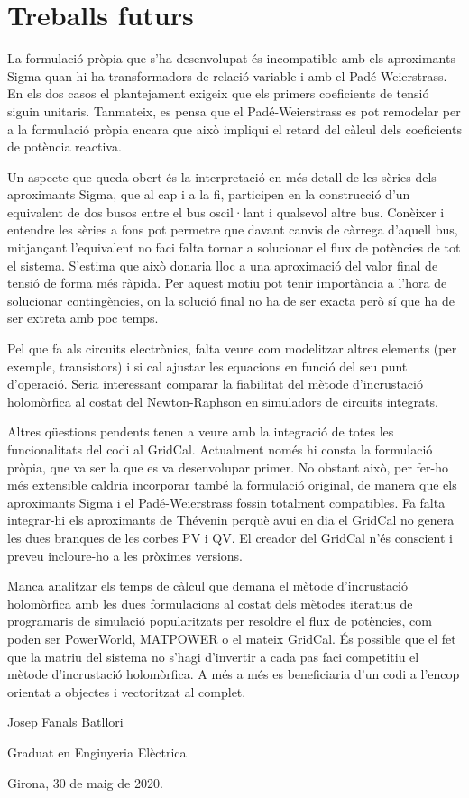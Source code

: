 \section{Treballs futurs}
La formulació pròpia que s'ha desenvolupat és incompatible amb els aproximants Sigma quan hi ha transformadors de relació variable i amb el Padé-Weierstrass. En els dos casos el plantejament exigeix que els primers coeficients de tensió siguin unitaris. Tanmateix, es pensa que el Padé-Weierstrass es pot remodelar per a la formulació pròpia encara que això impliqui el retard del càlcul dels coeficients de potència reactiva. 

Un aspecte que queda obert és la interpretació en més detall de les sèries dels aproximants Sigma, que al cap i a la fi, participen en la construcció d'un equivalent de dos busos entre el bus oscil·lant i qualsevol altre bus. Conèixer i entendre les sèries a fons pot permetre que davant canvis de càrrega d'aquell bus, mitjançant l'equivalent no faci falta tornar a solucionar el flux de potències de tot el sistema. S'estima que això donaria lloc a una aproximació del valor final de tensió de forma més ràpida. Per aquest motiu pot tenir importància a l'hora de solucionar contingències, on la solució final no ha de ser exacta però sí que ha de ser extreta amb poc temps.

Pel que fa als circuits electrònics, falta veure com modelitzar altres elements (per exemple, transistors) i si cal ajustar les equacions en funció del seu punt d'operació. Seria interessant comparar la fiabilitat del mètode d'incrustació holomòrfica al costat del Newton-Raphson en simuladors de circuits integrats. 

Altres qüestions pendents tenen a veure amb la integració de totes les funcionalitats del codi al GridCal. Actualment només hi consta la formulació pròpia, que va ser la que es va desenvolupar primer. No obstant això, per fer-ho més extensible caldria incorporar també la formulació original, de manera que els aproximants Sigma i el Padé-Weierstrass fossin totalment compatibles. Fa falta integrar-hi els aproximants de Thévenin perquè avui en dia el GridCal no genera les dues branques de les corbes PV i QV. El creador del GridCal n'és conscient i preveu incloure-ho a les pròximes versions.

Manca analitzar els temps de càlcul que demana el mètode d'incrustació holomòrfica amb les dues formulacions al costat dels mètodes iteratius de programaris de simulació popularitzats per resoldre el flux de potències, com poden ser PowerWorld, MATPOWER o el mateix GridCal. És possible que el fet que la matriu del sistema no s'hagi d'invertir a cada pas faci competitiu el mètode d'incrustació holomòrfica. A més a més es beneficiaria d'un codi a l'encop orientat a objectes i vectoritzat al complet.

\vspace*{\fill}
\par Josep Fanals Batllori
\vspace*{-16pt}
\par Graduat en Enginyeria Elèctrica
\vspace*{15pt}
\par Girona, 30 de maig de 2020.
\vspace*{4pt}